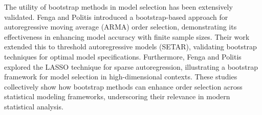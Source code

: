\documentclass[opre,sglanonrev,11pt]{informs4}
\begin{document}
The utility of bootstrap methods in model selection has been extensively validated. Fenga and Politis \citep{fenga2011bootstrap} introduced a bootstrap-based approach for autoregressive moving average (ARMA) order selection, demonstrating its effectiveness in enhancing model accuracy with finite sample sizes. Their work \citep{fenga2013bootstrap} extended this to threshold autoregressive models (SETAR), validating bootstrap techniques for optimal model specifications. Furthermore, Fenga and Politis \citep{fenga2017lasso} explored the LASSO technique for sparse autoregression, illustrating a bootstrap framework for model selection in high-dimensional contexts. These studies collectively show how bootstrap methods can enhance order selection across statistical modeling frameworks, underscoring their relevance in modern statistical analysis.

\end{document}
